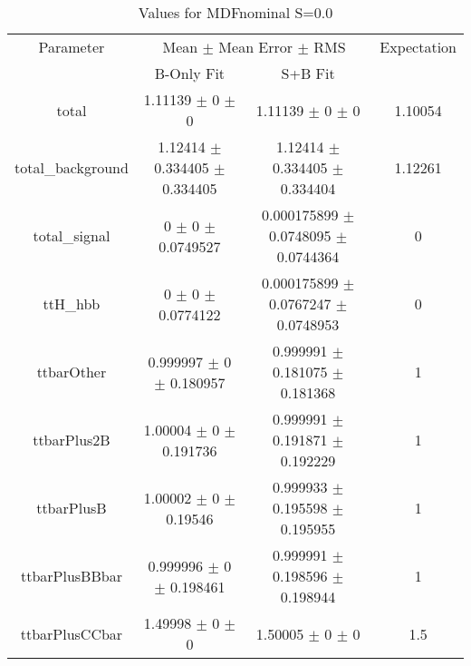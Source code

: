 \begin{table}
\centering
\caption{Values for MDFnominal S=0.0}
\begin{tabular}{cccc}
\toprule
Parameter & \multicolumn{2}{c}{Mean $\pm$ Mean Error $\pm$ RMS} & Expectation\\
 & B-Only Fit & S+B Fit & \\
\midrule
total & \num{1.11139} $\pm$ \num{0} $\pm$ \num{0} & \num{1.11139} $\pm$ \num{0} $\pm$ \num{0} & \num{1.10054}\\
total\_background & \num{1.12414} $\pm$ \num{0.334405} $\pm$ \num{0.334405} & \num{1.12414} $\pm$ \num{0.334405} $\pm$ \num{0.334404} & \num{1.12261}\\
total\_signal & \num{0} $\pm$ \num{0} $\pm$ \num{0.0749527} & \num{0.000175899} $\pm$ \num{0.0748095} $\pm$ \num{0.0744364} & \num{0}\\
ttH\_hbb & \num{0} $\pm$ \num{0} $\pm$ \num{0.0774122} & \num{0.000175899} $\pm$ \num{0.0767247} $\pm$ \num{0.0748953} & \num{0}\\
ttbarOther & \num{0.999997} $\pm$ \num{0} $\pm$ \num{0.180957} & \num{0.999991} $\pm$ \num{0.181075} $\pm$ \num{0.181368} & \num{1}\\
ttbarPlus2B & \num{1.00004} $\pm$ \num{0} $\pm$ \num{0.191736} & \num{0.999991} $\pm$ \num{0.191871} $\pm$ \num{0.192229} & \num{1}\\
ttbarPlusB & \num{1.00002} $\pm$ \num{0} $\pm$ \num{0.19546} & \num{0.999933} $\pm$ \num{0.195598} $\pm$ \num{0.195955} & \num{1}\\
ttbarPlusBBbar & \num{0.999996} $\pm$ \num{0} $\pm$ \num{0.198461} & \num{0.999991} $\pm$ \num{0.198596} $\pm$ \num{0.198944} & \num{1}\\
ttbarPlusCCbar & \num{1.49998} $\pm$ \num{0} $\pm$ \num{0} & \num{1.50005} $\pm$ \num{0} $\pm$ \num{0} & \num{1.5}\\
\bottomrule
\end{tabular}
\end{table}